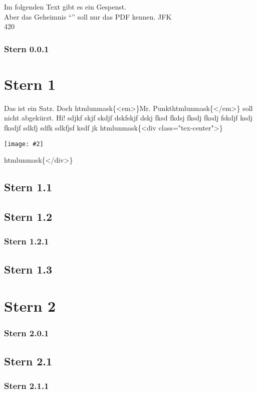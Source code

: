 \documentclass{article}
\title{\mytitle}
\newcommand{\mytitle}{How To Zotero: Gardner/Springfeld-CSL}
\newif\ifhtml
\newcommand{\htmlonly}[1]{\ifhtml#1\else\fi}
\newif\ifpdf
\newcommand{\pdfonly}[1]{\ifpdf#1\else\fi}
\newcommand{\htmltagunique}[1]{htmlunmask\{#1\}}
\newcommand{\htmltag}[3]{\htmltagunique{#1}#2\htmltagunique{#3}}
\newcommand{\htmltagunique}[1]{}
\newcommand{\htmltag}[3]{#2}
\newcommand{\incl}[2]{\begin{center}\texttt{[image: \#2]}\end{center}}
\newcommand{\inclc}[2]{\htmltag{<div class="tex-center">}{\incl{#1}{#2}}{</div>}}
\newcommand{\inclc}[2]{\begin{center}\incl{#1}{#2}\end{center}}
\begin{document}
\pdfonly{
\begin{center}
{\LARGE\textbf\mytitle}
\end{center}
}
Im folgenden Text gibt es ein \htmlonly{verstecktes} Gespenst.
\\
Aber das Geheimnis ``\pdfonly{hihihi}'' soll nur das PDF kennen. JFK
\\
420\htmlonly{69}
\pdfonly{pdfonly}
\pagestyle{fancy}
\subsubsection{Stern 0.0.1}
\section{Stern 1}
Das ist ein Satz. Doch \htmltag{<em>}{Mr. Punkt}{</em>} soll nicht abgek\"urzt. Hi! sdjkf skjf skdjf dskfskjf dskj fksd fkdsj fksdj fksdj fskdjf ksdj fksdjf sdkfj sdfk sdkfjsf ksdf jk
\inclc{0.5}{res/smile.png}
\subsection{Stern 1.1}
\subsection{Stern 1.2}
\subsubsection{Stern 1.2.1}
\subsection{Stern 1.3}
\section{Stern 2}
\subsubsection{Stern 2.0.1}
\subsection{Stern 2.1}
\subsubsection{Stern 2.1.1}
\end{document}
